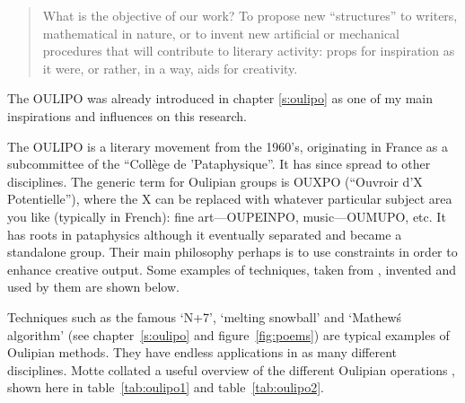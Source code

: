 \begin{quotation}
  What is the objective of our work? To propose new ``structures'' to writers, mathematical in nature, or to invent new artificial or mechanical procedures that will contribute to literary activity: props for inspiration as it were, or rather, in a way, aids for creativity. 
\end{quotation}

The \acf{OULIPO} was already introduced in chapter \ref{s:oulipo} as one of my main inspirations and influences on this research.

The \ac{OULIPO} is a literary movement from the 1960's, originating in France as a subcommittee of the ``Coll\`{e}ge de 'Pataphysique''. It has since spread to other disciplines. The generic term for Oulipian groups is OUXPO (``Ouvroir d'X Potentielle''), where the X can be replaced with whatever particular subject area you like (typically in French): fine art---OUPEINPO, music---OUMUPO, etc. It has roots in pataphysics although it eventually separated and became a standalone group. Their main philosophy perhaps is to use constraints in order to enhance creative output. Some examples of techniques, taken from \autocite{Mathews2005}, invented and used by them are shown below.

Techniques such as the famous `N+7', `melting snowball' and `Mathew\'s algorithm' (see chapter~\ref{s:oulipo} and figure~\ref{fig:poems}) are typical examples of Oulipian methods. They have endless applications in as many different disciplines. Motte collated a useful overview of the different Oulipian operations \autocite*{Motte2007}, shown here in table~\ref{tab:oulipo1} and table~\ref{tab:oulipo2}.

